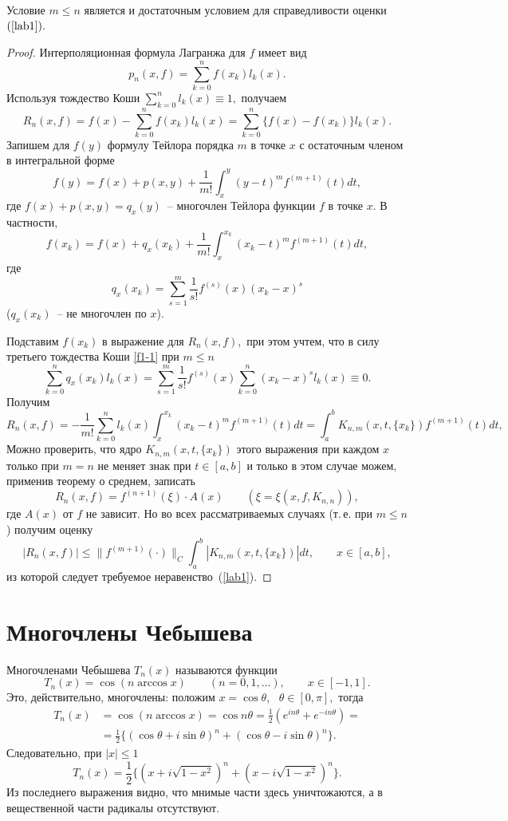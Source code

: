 \begin{lemma}
Условие $m \le n$ является и достаточным условием для справедливости
оценки~$(\ref{lab1}).$
\end{lemma}

\begin{proof}
Интерполяционная формула Лагранжа для $f$ имеет вид
\[
  p_n(x,f)=\sum\limits_{k=0}^n f(x_k) l_k(x).
\]
Используя тождество Коши $\sum\limits_{k=0}^n l_k(x) \equiv 1,$ получаем
$$
R_n(x,f)=f(x)-\sum\limits_{k=0}^nf(x_k)l_k(x)=\sum\limits_{k=0}^n \{f(x)-f(x_k) \} l_k(x).
$$
Запишем для $f(y)$ формулу Тейлора порядка $m$ в точке $x$ с остаточным
членом в интегральной форме
\[
  f(y)=f(x)+p(x,y)+\frac{1}{m!}\int_x^y (y-t)^m f^{(m+1)}(t)dt,
\]
где $f(x)+p(x,y)=q_x(y)$~-- многочлен Тейлора функции $f$ в точке $x.$ В частности,
\[
 f(x_k)=f(x)+q_x(x_k)+\frac{1}{m!}\int_x^{x_k} (x_k-t)^m f^{(m+1)}(t)dt,
\]
где
$$
q_x(x_k) = \sum\limits_{s=1}^m\frac{1}{s!}f^{(s)}(x)(x_k-x)^s
$$
($q_x(x_k)$~-- не многочлен по $x$).

Подставим $f(x_k)$ в выражение для $R_n(x,f),$ при этом учтем, что в
силу третьего тождества Коши \eqref{f1-1} при $m \le n$
$$
\sum\limits_{k=0}^n q_x(x_k)l_k(x)=\sum\limits_{{s=1}}^m{\frac{1}{s!}f^{(s)}(x)
 \sum\limits_{k=0}^n{(x_k-x)^s}l_k(x)}\equiv
0.
$$
{Получим}
\[
{  R_n(x,f)=-\frac{1}{m!} \sum\limits_{k=0}^n l_k(x)
                         \int_x^{x_k} (x_k-t)^m f^{(m+1)}(t)dt=
                         \int_a^b K_{n,m}(x,t,\{x_k\}) f^{(m+1)}(t)dt,}
\]
{Можно проверить, что ядро $K_{n,m}(x,t,\{x_k\})$} этого
выражения при каждом $x$ только при $m=n$ не {меняет знак при $t \in
[a,b]$} и только в этом случае можем,
{применив теорему о среднем,} записать
\[
  R_n(x,f)=f^{(n+1)}(\xi) \cdot A(x)\qquad {(\xi = \xi(x, f, K_{n,n})),}
\]
где $A(x)$ от $f$ не зависит. {Но во} всех {рассматриваемых} случаях {(т.\,е.
при $m \le n$)} получим оценку
\[
  |R_n(x,f)| \le \|f^{(m+1)}(\cdot )\|_C
        \int_a^b |K_{n,m}(x,t,\{x_k\})| dt,\qquad x \in [a,b],
\]
из которой следует требуемое неравенство~(\ref{lab1}).
\end{proof}

\section{Многочлены Чебышева}

Многочленами Чебышева $T_n(x)$ {называются функции}
$$
  T_n(x)=\cos (n\arccos x) \qquad (n=0,1,\dots ),\qquad  x \in [-1,1].
$$
Это, действительно, многочлены: положим $x= \cos \theta$,~ {$\theta \in [0, \pi],$} тогда
$$
\begin{aligned}
T_n(x) &=\cos (n \arccos x)= \cos n\theta = {\frac{1}{2}(e^{in\theta} +
e^{-in\theta})
=} \\
   &=\frac{1}{2}\{(\cos \theta +i \sin \theta)^n+(\cos \theta -i \sin \theta)^n\}.
\end{aligned}
$$
{Следовательно, при $|x| \le 1$}
$$
T_n(x)=\frac{1}{2}\{(x +i \sqrt{1-x^2})^n+(x -i \sqrt{1-x^2})^n\}.
$$
Из последнего выражения видно, что мнимые части {здесь} уничтожаются, {а в}
{вещественной части радикалы отсутствуют}.

